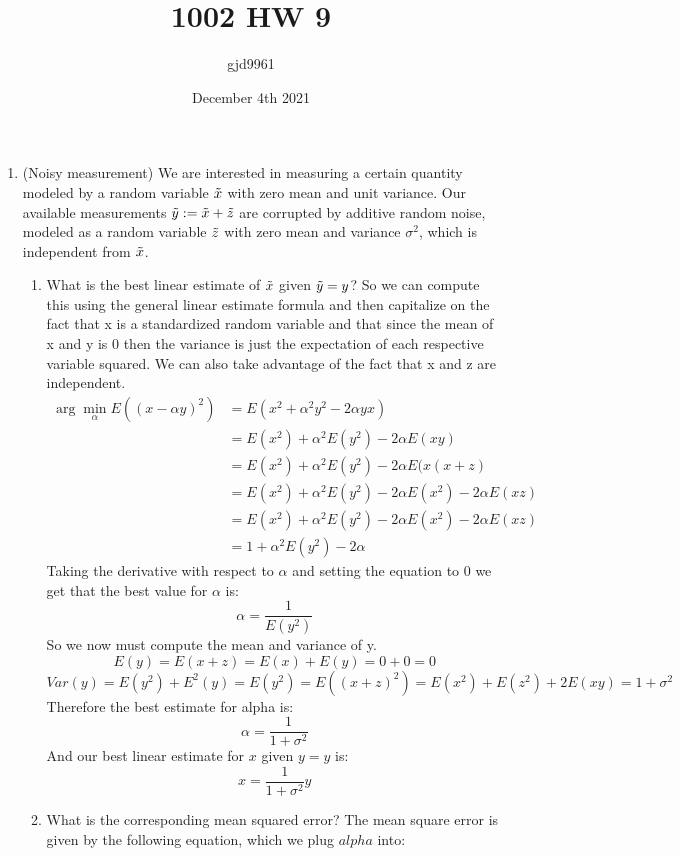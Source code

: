 \documentclass[12pt,twoside]{article}
\title{1002 HW 9}
\author{gjd9961 }
\date{December 4th 2021}
\newcommand{\ry}{\rnd{ y}  }
\newcommand{\rx}{\rnd{ x}  }
\newcommand{\rnd}{\Tilde}
\begin{document}
\maketitle
\begin{enumerate}

\item (Noisy measurement)
We are interested in measuring a certain quantity modeled by a random variable $\rx$ with zero mean and unit variance. Our available measurements $\ry: = \rx + \rnd{z}$ are corrupted by additive random noise, modeled as a random variable $\rnd{z}$ with zero mean and variance $\sigma^2$, which is independent from $\rx$.  
\begin{enumerate}
\item What is the best linear estimate of $\rx$ given $\ry = y$?
\subitem
So we can compute this using the general linear estimate formula and then capitalize on the fact that x is a standardized random variable and that since the mean of x and y is 0 then the variance is just the expectation of each respective variable squared. We can also take advantage of the fact that x and z are independent. 
\begin{equation}
    \begin{split}
        \arg \min_\alpha E((x-\alpha y)^2) &= E(x^2 + \alpha^2y^2 - 2\alpha yx)\\
        &= E(x^2) + \alpha^2E(y^2) - 2\alpha E(xy) \\
        &= E(x^2) + \alpha^2E(y^2) - 2\alpha E(x(x+z) \\
        &= E(x^2) + \alpha^2E(y^2) - 2\alpha E(x^2) - 2\alpha E(xz) \\
        &= E(x^2) + \alpha^2E(y^2) - 2\alpha E(x^2) - 2\alpha E(xz) \\
        &= 1 + \alpha^2E(y^2) - 2\alpha
    \end{split}
\end{equation}
Taking the derivative with respect to $\alpha$ and setting the equation to 0 we get that the best value for $\alpha$ is:
$$
    \alpha = \frac{1}{E(y^2)}
$$
So we now must compute the mean and variance of y.
$$
    E(y) = E(x+z) = E(x) + E(y) = 0 + 0 = 0
$$
$$
    Var(y) = E(y^2) + E^2(y) = E(y^2) = E((x+z)^2) = E(x^2) + E(z^2) + 2E(xy) = 1 + \sigma^2
$$
Therefore the best estimate for alpha is:
$$
    \alpha = \frac{1}{1 + \sigma^2}
$$
And our best linear estimate for $x$ given $y=y$ is:
$$
    x = \frac{1}{1 + \sigma^2}y
$$
\item What is the corresponding mean squared error?
The mean square error is given by the following equation, which we plug $alpha$ into:

\end{enumerate}
\end{enumerate}
\end{document}
